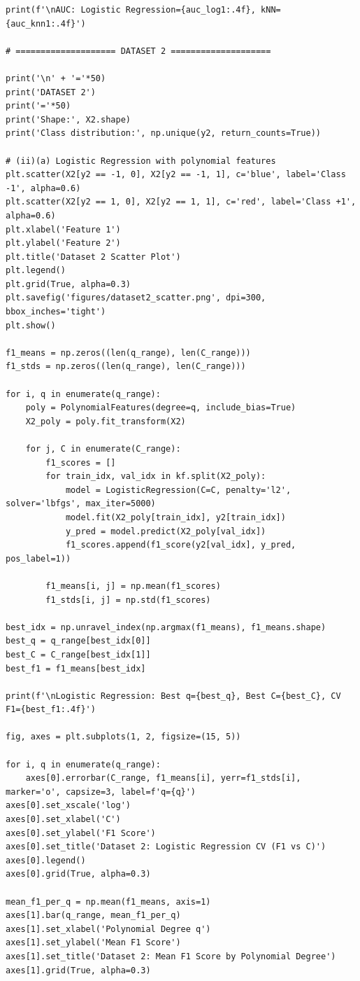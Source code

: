 \documentclass[11pt,a4paper]{article}
\begin{document}
\begin{lstlisting}
print(f'\nAUC: Logistic Regression={auc_log1:.4f}, kNN={auc_knn1:.4f}')

# ==================== DATASET 2 ====================

print('\n' + '='*50)
print('DATASET 2')
print('='*50)
print('Shape:', X2.shape)
print('Class distribution:', np.unique(y2, return_counts=True))

# (ii)(a) Logistic Regression with polynomial features
plt.scatter(X2[y2 == -1, 0], X2[y2 == -1, 1], c='blue', label='Class -1', alpha=0.6)
plt.scatter(X2[y2 == 1, 0], X2[y2 == 1, 1], c='red', label='Class +1', alpha=0.6)
plt.xlabel('Feature 1')
plt.ylabel('Feature 2')
plt.title('Dataset 2 Scatter Plot')
plt.legend()
plt.grid(True, alpha=0.3)
plt.savefig('figures/dataset2_scatter.png', dpi=300, bbox_inches='tight')
plt.show()

f1_means = np.zeros((len(q_range), len(C_range)))
f1_stds = np.zeros((len(q_range), len(C_range)))

for i, q in enumerate(q_range):
    poly = PolynomialFeatures(degree=q, include_bias=True)
    X2_poly = poly.fit_transform(X2)
    
    for j, C in enumerate(C_range):
        f1_scores = []
        for train_idx, val_idx in kf.split(X2_poly):
            model = LogisticRegression(C=C, penalty='l2', solver='lbfgs', max_iter=5000)
            model.fit(X2_poly[train_idx], y2[train_idx])
            y_pred = model.predict(X2_poly[val_idx])
            f1_scores.append(f1_score(y2[val_idx], y_pred, pos_label=1))
        
        f1_means[i, j] = np.mean(f1_scores)
        f1_stds[i, j] = np.std(f1_scores)

best_idx = np.unravel_index(np.argmax(f1_means), f1_means.shape)
best_q = q_range[best_idx[0]]
best_C = C_range[best_idx[1]]
best_f1 = f1_means[best_idx]

print(f'\nLogistic Regression: Best q={best_q}, Best C={best_C}, CV F1={best_f1:.4f}')

fig, axes = plt.subplots(1, 2, figsize=(15, 5))

for i, q in enumerate(q_range):
    axes[0].errorbar(C_range, f1_means[i], yerr=f1_stds[i], marker='o', capsize=3, label=f'q={q}')
axes[0].set_xscale('log')
axes[0].set_xlabel('C')
axes[0].set_ylabel('F1 Score')
axes[0].set_title('Dataset 2: Logistic Regression CV (F1 vs C)')
axes[0].legend()
axes[0].grid(True, alpha=0.3)

mean_f1_per_q = np.mean(f1_means, axis=1)
axes[1].bar(q_range, mean_f1_per_q)
axes[1].set_xlabel('Polynomial Degree q')
axes[1].set_ylabel('Mean F1 Score')
axes[1].set_title('Dataset 2: Mean F1 Score by Polynomial Degree')
axes[1].grid(True, alpha=0.3)


\end{lstlisting}
\end{document}
